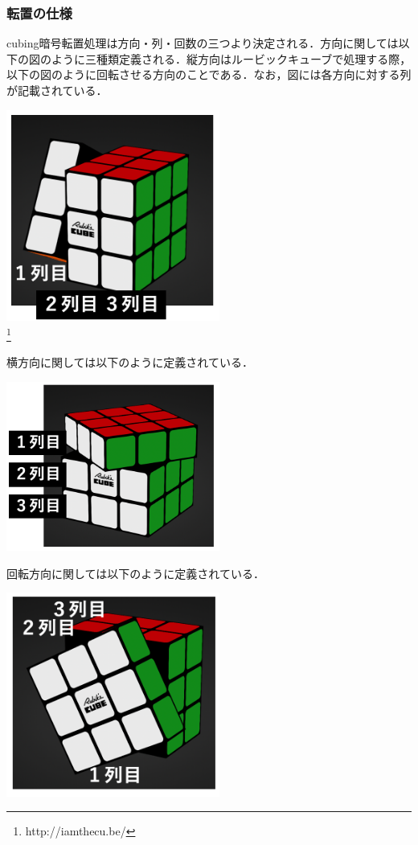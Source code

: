 \documentclass{jsarticle}
\begin{document}
\subsubsection{転置の仕様}
cubing暗号転置処理は方向・列・回数の三つより決定される．方向に関しては以下の図のように三種類定義される．縦方向はルービックキューブで処理する際，以下の図のように回転させる方向のことである．なお，図には各方向に対する列が記載されている．
\begin{center}
  \includegraphics[width=7cm]{./tex_pic/tate.jpg}\\
\footnote{http://iamthecu.be/}
\end{center}
横方向に関しては以下のように定義されている．
\begin{center}
  \includegraphics[width=7cm]{./tex_pic/yoko.jpg}\\
\footnotemark[1]
\end{center}
回転方向に関しては以下のように定義されている．
\begin{center}
  \includegraphics[width=7cm]{./tex_pic/kai.jpg}\\
\footnotemark[1]
\end{center}
\end{document}
